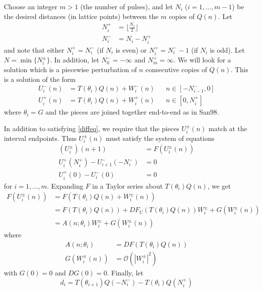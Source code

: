 \documentclass[12pt]{article}
\begin{document}
Choose an integer $m > 1$ (the number of pulses), and let $N_i$ ($i = 1, \dots, m-1$) be the desired distances (in lattice points) between the $m$ copies of $Q(n)$. Let 
\begin{equation}\label{Nipm}
\begin{aligned}
N_i^+ &= \lfloor \frac{N_i}{2} \rfloor \\
N_i^- &= N_i - N_i^+
\end{aligned}
\end{equation}
and note that either $N_i^+ = N_i^-$ (if $N_i$ is even) or $N_i^+ = N_i^- - 1$ (if $N_i$ is odd). Let $N = \min\{ N_i^\pm \}$. In addition, let $N_0^- = -\infty$ and $N_m^+ = \infty$. We will look for a solution which is a piecewise perturbation of $n$ consecutive copies of $Q(n)$. This is a solution of the form
\begin{align}\label{Upiecewise}
U_i^-(n) &= T(\theta_i) Q(n) + W_i^-(n) && n \in [-N_{i-1}^-, 0] \\
U_i^+(n) &= T(\theta_i) Q(n) + W_i^+(n) && n \in [0, N_i^+]
\end{align}
where $\theta_i = G$ and the pieces are joined together end-to-end as in San98.

In addition to satisfying \eqref{diffeq}, we require that the pieces $U_i^\pm(n)$ match at the interval endpoints. Thus $U_i^\pm(n)$ must satisfy the system of equations
\begin{equation}\label{Usystem}
\begin{aligned}
(U_i^\pm)(n+1) &= F(U_i^\pm(n))  \\
U_i^+(N_i^+) - U_{i+1}^-(-N_i^-) &= 0 \\
U_i^+(0) - U_i^-(0) &= 0
\end{aligned}
\end{equation}
for $i = 1, \dots, m$. Expanding $F$ in a Taylor series about $T(\theta_i) Q(n)$, we get
\begin{align*}
F(U_i^\pm(n)) &= F(T(\theta_i) Q(n) + W_i^\pm(n)) \\
&= F(T(\theta_i) Q(n)) + DF_{U}(T(\theta_i) Q(n)) W_i^\pm + G(W_i^\pm(n)) \\
&= A(n; \theta_i) W_i^\pm + G(W_i^\pm(n))
\end{align*}
where
\begin{align*}
A(n; \theta_i) &= DF(T(\theta_i) Q(n))\\
G(W_i^\pm(n)) &= \mathcal{O}(|W_i^\pm|^2)
\end{align*}
with $G(0) = 0$ and $DG(0) = 0$. Finally, let 
\begin{equation}\label{defdi}
d_i = T(\theta_{i+1}) Q(-N_i^-) - T(\theta_i) Q(N_i^+)
\end{equation}
\end{document}
